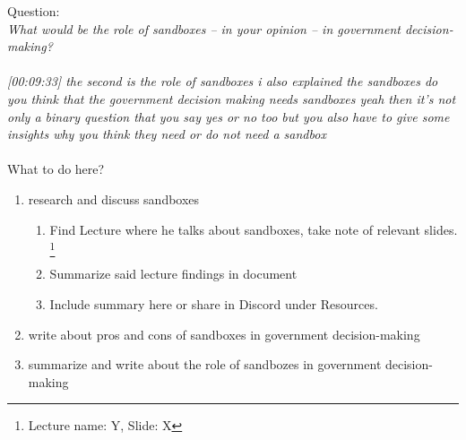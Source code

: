 Question:\\
\emph{
    What would be the role of sandboxes – in your opinion – in government decision-making?
}\\\\
\emph{[00:09:33] the second is the role of sandboxes i also explained the sandboxes do you think that the government decision making needs sandboxes
yeah then it's not only a binary question that you say yes or no too but you also have to give some insights
why you think they need or do not need a sandbox}\\\\
What to do here?
\begin{enumerate}
    \item research and discuss sandboxes
    \begin{enumerate}
    \item Find Lecture where he talks about sandboxes, take note of relevant slides.
    \footnote{Lecture name: Y, Slide: X}
    \item Summarize said lecture findings in document
    \item Include summary here or share in Discord under Resources.
    \end{enumerate}
    \item write about pros and cons of sandboxes in government decision-making
    \item summarize and write about the role of sandbozes in government decision-making
  \end{enumerate}

